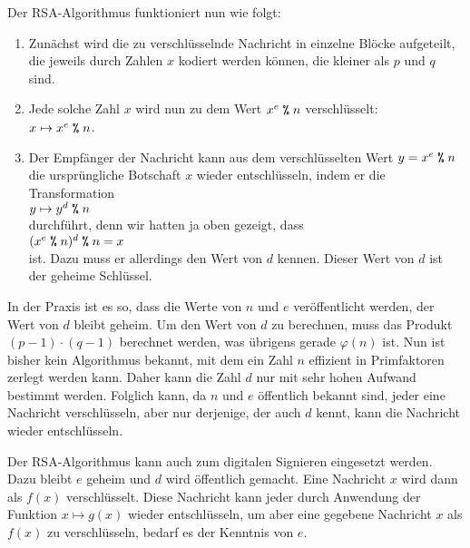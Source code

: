 Der RSA-Algorithmus funktioniert nun wie folgt: 
\begin{enumerate}
\item Zun\"{a}chst wird die zu verschl\"{u}sselnde Nachricht in einzelne Bl\"{o}cke aufgeteilt, die
      jeweils durch Zahlen $x$ kodiert werden k\"{o}nnen, die kleiner als $p$ und $q$ sind.
\item Jede solche Zahl $x$ wird nun zu dem Wert $x^e \;\texttt{\%}\; n$ verschl\"{u}sselt:
      \\[0.2cm]
      \hspace*{1.3cm}
      $x \mapsto x^e \;\texttt{\%}\; n$.
\item Der Empf\"{a}nger der Nachricht kann aus dem verschl\"{u}sselten Wert $y = x^e \;\texttt{\%}\; n$ die
      urspr\"{u}ngliche Botschaft $x$ wieder entschl\"{u}sseln, indem er die Transformation
      \\[0.2cm]
      \hspace*{1.3cm}
      $y \mapsto y^d \;\texttt{\%}\; n$
      \\[0.2cm]
      durchf\"{u}hrt, denn wir hatten ja oben gezeigt, dass
      \\[0.2cm]
      \hspace*{1.3cm}
      $(x^e \;\texttt{\%}\; n)^d \;\texttt{\%}\; n = x$
      \\[0.2cm]
      ist.  Dazu muss er allerdings den Wert von $d$ kennen.  Dieser Wert von $d$ ist der geheime Schl\"{u}ssel.
\end{enumerate}
In der Praxis ist es so, dass die Werte von $n$ und $e$ ver\"{o}ffentlicht werden, der Wert
von $d$ bleibt geheim.   Um den Wert von $d$ zu berechnen, muss das Produkt 
$(p-1) \cdot (q-1)$ berechnet werden, was \"{u}brigens gerade $\varphi(n)$ ist.  Nun ist
bisher kein Algorithmus bekannt, mit dem ein Zahl $n$ effizient in Primfaktoren zerlegt
werden kann.  Daher kann die Zahl $d$ nur mit sehr hohen Aufwand bestimmt werden.
Folglich kann, da $n$ und $e$ \"{o}ffentlich bekannt sind, jeder eine Nachricht verschl\"{u}sseln,
aber nur derjenige, der auch $d$ kennt, kann die Nachricht wieder entschl\"{u}sseln.

Der RSA-Algorithmus kann auch zum digitalen Signieren eingesetzt werden.  Dazu bleibt $e$ geheim und
$d$ wird \"{o}ffentlich gemacht. Eine Nachricht $x$ wird dann als $f(x)$ verschl\"{u}sselt.  Diese Nachricht kann
jeder durch Anwendung der Funktion $x \mapsto g(x)$ wieder entschl\"{u}sseln, um aber eine gegebene Nachricht
$x$ als $f(x)$ zu verschl\"{u}sseln, bedarf es der Kenntnis von $e$.

